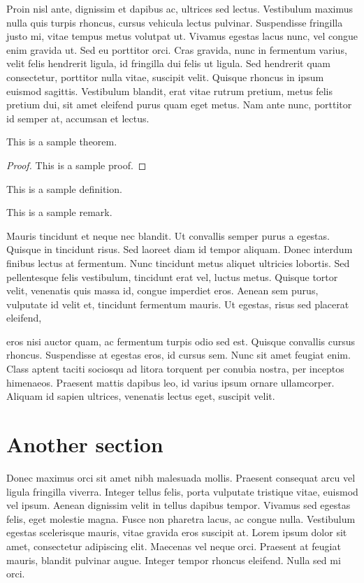 \documentclass{lecnotes}
\begin{document}
	Proin nisl ante, dignissim et dapibus ac, ultrices sed lectus. Vestibulum maximus nulla quis turpis rhoncus, cursus vehicula lectus pulvinar. Suspendisse fringilla justo mi, vitae tempus metus volutpat ut. Vivamus egestas lacus nunc, vel congue enim gravida ut. Sed eu porttitor orci. Cras gravida, nunc in fermentum varius, velit felis hendrerit ligula, id fringilla dui felis ut ligula. Sed hendrerit quam consectetur, porttitor nulla vitae, suscipit velit. Quisque rhoncus in ipsum euismod sagittis. Vestibulum blandit, erat vitae rutrum pretium, metus felis pretium dui, sit amet eleifend purus quam eget metus. Nam ante nunc, porttitor id semper at, accumsan et lectus.
	\begin{theorem}%
		This is a sample theorem.
	\end{theorem}
	\begin{proof}
		This is a sample proof.
	\end{proof}
	\begin{definition}
		This is a sample definition.
	\end{definition}
	\begin{remark}
		This is a sample remark.
	\end{remark}
	Mauris tincidunt et neque nec blandit. Ut convallis semper purus a egestas. Quisque in tincidunt risus. Sed laoreet diam id tempor aliquam. Donec interdum finibus lectus at fermentum. Nunc tincidunt metus aliquet ultricies lobortis. Sed pellentesque felis vestibulum, tincidunt erat vel, luctus metus. Quisque tortor velit, venenatis quis massa id, congue imperdiet eros. Aenean sem purus, vulputate id velit et, tincidunt fermentum mauris. Ut egestas, risus sed placerat eleifend, 
	
	
	eros nisi auctor quam, ac fermentum turpis odio sed est. Quisque convallis cursus rhoncus. Suspendisse at egestas eros, id cursus sem. Nunc sit amet feugiat enim. Class aptent taciti sociosqu ad litora torquent per conubia nostra, per inceptos himenaeos. Praesent mattis dapibus leo, id varius ipsum ornare ullamcorper. Aliquam id sapien ultrices, venenatis lectus eget, suscipit velit.
	
	\section{Another section}
	Donec maximus orci sit amet nibh malesuada mollis. Praesent consequat arcu vel ligula fringilla viverra. Integer tellus felis, porta vulputate tristique vitae, euismod vel ipsum. Aenean dignissim velit in tellus dapibus tempor. Vivamus sed egestas felis, eget molestie magna. Fusce non pharetra lacus, ac congue nulla. Vestibulum egestas scelerisque mauris, vitae gravida eros suscipit at. Lorem ipsum dolor sit amet, consectetur adipiscing elit. Maecenas vel neque orci. Praesent at feugiat mauris, blandit pulvinar augue. Integer tempor rhoncus eleifend. Nulla sed mi orci.
	\appendix
\end{document}
